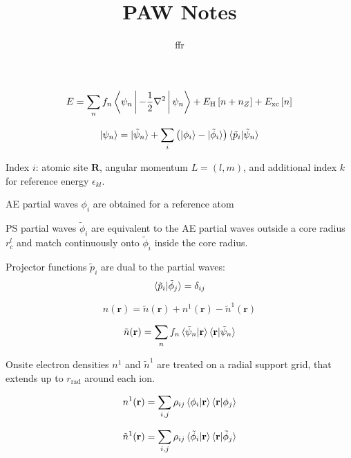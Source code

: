 \documentclass[english,10pt,aspectratio=169,fleqn]{beamer}
\begin{document}
\title{PAW Notes}
\author{ffr}
\institute{}
\date{}

\frame{\titlepage}





\begin{frame}

\begin{equation*}
E = \sum_{n} f_{n} \Braket{\psi_{n} | -\frac{1}{2}\nabla^2 | \psi_{n}} +
E_{\mathrm{H}}\left[ n + n_{Z} \right] + E_{\mathrm{xc}}\left[ n \right]
\end{equation*}

\begin{equation*}
\ket{\psi_{n}} = \ket{\tilde{\psi}_{n}} + \sum_{i} \left(
\ket{\phi_{i}} - \ket{\tilde{\phi}_{i}} \right)
\braket{ \tilde{p}_{i} | \tilde{\psi}_{n} }
\end{equation*}

Index $i$: atomic site $\mathbf{R}$, angular momentum  $L = (l,m)$, and additional
index $k$ for reference energy $\epsilon_{kl}$.

AE partial waves $\phi_{i}$ are obtained for a reference atom

PS partial waves $\tilde{\phi}_{i}$ are equivalent to the AE partial waves outside
a core radius $r^{l}_{c}$ and match continuously onto $\tilde{\phi}_{i}$ inside the
core radius.

Projector functions $\tilde{p}_{i}$ are dual to the partial waves:
\begin{equation*}
\braket{\tilde{p}_{i} | \tilde{\phi}_{j}} = \delta_{ij}
\end{equation*}

\end{frame}


\begin{frame} %

\begin{equation*}
n(\mathbf{r}) = \tilde{n}(\mathbf{r}) + n^{1}(\mathbf{r}) - \tilde{n}^{1}(\mathbf{r})
\end{equation*}

\begin{equation*}
\tilde{n}(\mathbf{r}) = \sum_{n} f_{n} \braket{\tilde{\psi}_{n} | \mathbf{r}}
\braket{\mathbf{r} | \tilde{\psi}_{n}}
\end{equation*}

Onsite electron densities $n^{1}$ and $\tilde{n}^{1}$ are treated on a radial
support grid, that extends up to $r_{\mathrm{rad}}$ around each ion.

\begin{equation*}
n^{1}(\mathbf{r}) = \sum_{i,j} \rho_{ij} \braket{\phi_{i} | \mathbf{r}}
\braket{\mathbf{r} | \phi_{j}}
\end{equation*}

\begin{equation*}
\tilde{n}^{1}(\mathbf{r}) = \sum_{i,j} \rho_{ij} \braket{\tilde{\phi}_{i} | \mathbf{r}}
  \braket{\mathbf{r} | \tilde{\phi}_{j}}
\end{equation*}


\end{frame}
\end{document}
